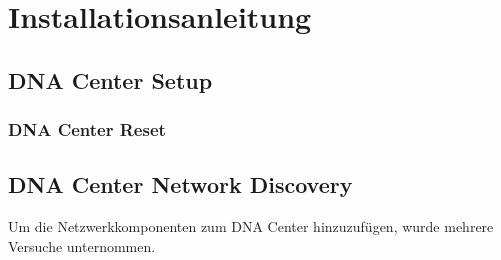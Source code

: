 \section{Installationsanleitung}

\subsection{DNA Center Setup}



\subsubsection{DNA Center Reset}



\subsection{DNA Center Network Discovery}

Um die Netzwerkkomponenten zum DNA Center hinzuzufügen, wurde mehrere Versuche unternommen. 
